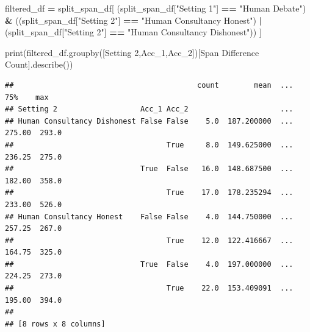 \documentclass[
]{article}
\newenvironment{Shaded}{\begin{snugshade}}{\end{snugshade}}
\newcommand{\BuiltInTok}[1]{#1}
\newcommand{\NormalTok}[1]{#1}
\newcommand{\OperatorTok}[1]{\textcolor[rgb]{0.81,0.36,0.00}{\textbf{#1}}}
\newcommand{\StringTok}[1]{\textcolor[rgb]{0.31,0.60,0.02}{#1}}
\begin{document}
\begin{Shaded}
\begin{Highlighting}[]
\NormalTok{filtered\_df }\OperatorTok{=}\NormalTok{ split\_span\_df[}
\NormalTok{    (split\_span\_df[}\StringTok{"Setting 1"}\NormalTok{] }\OperatorTok{==} \StringTok{"Human Debate"}\NormalTok{) }\OperatorTok{\&}
\NormalTok{    ((split\_span\_df[}\StringTok{"Setting 2"}\NormalTok{] }\OperatorTok{==} \StringTok{"Human Consultancy Honest"}\NormalTok{) }\OperatorTok{|}\NormalTok{ (split\_span\_df[}\StringTok{"Setting 2"}\NormalTok{] }\OperatorTok{==} \StringTok{"Human Consultancy Dishonest"}\NormalTok{))}
\NormalTok{]}

\BuiltInTok{print}\NormalTok{(filtered\_df.groupby([}\StringTok{\textquotesingle{}Setting 2\textquotesingle{}}\NormalTok{,}\StringTok{\textquotesingle{}Acc\_1\textquotesingle{}}\NormalTok{,}\StringTok{\textquotesingle{}Acc\_2\textquotesingle{}}\NormalTok{])[}\StringTok{\textquotesingle{}Span Difference Count\textquotesingle{}}\NormalTok{].describe())}
\end{Highlighting}
\end{Shaded}

\begin{verbatim}
##                                          count        mean  ...     75%    max
## Setting 2                   Acc_1 Acc_2                     ...               
## Human Consultancy Dishonest False False    5.0  187.200000  ...  275.00  293.0
##                                   True     8.0  149.625000  ...  236.25  275.0
##                             True  False   16.0  148.687500  ...  182.00  358.0
##                                   True    17.0  178.235294  ...  233.00  526.0
## Human Consultancy Honest    False False    4.0  144.750000  ...  257.25  267.0
##                                   True    12.0  122.416667  ...  164.75  325.0
##                             True  False    4.0  197.000000  ...  224.25  273.0
##                                   True    22.0  153.409091  ...  195.00  394.0
## 
## [8 rows x 8 columns]
\end{verbatim}
\end{document}

